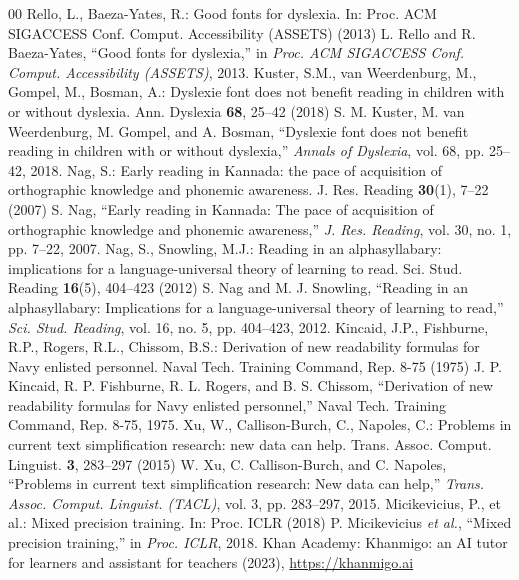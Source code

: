 \begin{thebibliography}{00}
\ifspringer{} Rello, L., Baeza-Yates, R.: Good fonts for dyslexia. In: Proc. ACM SIGACCESS Conf. Comput. Accessibility (ASSETS) (2013)
\else{} L. Rello and R. Baeza-Yates, ``Good fonts for dyslexia,'' in \textit{Proc. ACM SIGACCESS Conf. Comput. Accessibility (ASSETS)}, 2013.\fi
\ifspringer{} Kuster, S.M., van Weerdenburg, M., Gompel, M., Bosman, A.: Dyslexie font does not benefit reading in children with or without dyslexia. Ann. Dyslexia \textbf{68}, 25--42 (2018)
\else{} S. M. Kuster, M. van Weerdenburg, M. Gompel, and A. Bosman, ``Dyslexie font does not benefit reading in children with or without dyslexia,'' \textit{Annals of Dyslexia}, vol. 68, pp. 25--42, 2018.\fi
\ifspringer{} Nag, S.: Early reading in Kannada: the pace of acquisition of orthographic knowledge and phonemic awareness. J. Res. Reading \textbf{30}(1), 7--22 (2007)
\else{} S. Nag, ``Early reading in Kannada: The pace of acquisition of orthographic knowledge and phonemic awareness,'' \textit{J. Res. Reading}, vol. 30, no. 1, pp. 7--22, 2007.\fi
\ifspringer{} Nag, S., Snowling, M.J.: Reading in an alphasyllabary: implications for a language-universal theory of learning to read. Sci. Stud. Reading \textbf{16}(5), 404--423 (2012)
\else{} S. Nag and M. J. Snowling, ``Reading in an alphasyllabary: Implications for a language-universal theory of learning to read,'' \textit{Sci. Stud. Reading}, vol. 16, no. 5, pp. 404--423, 2012.\fi
\ifspringer{} Kincaid, J.P., Fishburne, R.P., Rogers, R.L., Chissom, B.S.: Derivation of new readability formulas for Navy enlisted personnel. Naval Tech. Training Command, Rep. 8-75 (1975)
\else{} J. P. Kincaid, R. P. Fishburne, R. L. Rogers, and B. S. Chissom, ``Derivation of new readability formulas for Navy enlisted personnel,'' Naval Tech. Training Command, Rep. 8-75, 1975.\fi
\ifspringer{} Xu, W., Callison-Burch, C., Napoles, C.: Problems in current text simplification research: new data can help. Trans. Assoc. Comput. Linguist. \textbf{3}, 283--297 (2015)
\else{} W. Xu, C. Callison-Burch, and C. Napoles, ``Problems in current text simplification research: New data can help,'' \textit{Trans. Assoc. Comput. Linguist. (TACL)}, vol. 3, pp. 283--297, 2015.\fi
\fi
\ifspringer{} Micikevicius, P., et al.: Mixed precision training. In: Proc. ICLR (2018)
\else{} P. Micikevicius \textit{et al.}, ``Mixed precision training,'' in \textit{Proc. ICLR}, 2018.\fi
\ifspringer{} Khan Academy: Khanmigo: an AI tutor for learners and assistant for teachers (2023), \url{https://khanmigo.ai}

\end{thebibliography}

